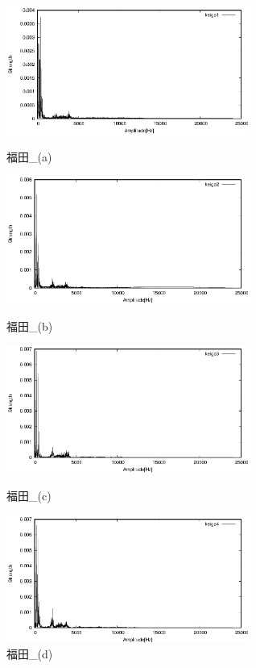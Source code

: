 \documentclass[titlepage]{jarticle}
\begin{document}
\begin{figure}[H]
  \begin{minipage}{0.495\hsize}
    \centering
    \includegraphics[width=8cm]{img/keigo1.eps}
    \caption{福田\_(a)}
    \label{keigo1}
  \end{minipage}
  \begin{minipage}{0.495\hsize}
    \centering
    \includegraphics[width=8cm]{img/keigo2.eps}
    \caption{福田\_(b)}
    \label{keigo2}
  \end{minipage}


  \begin{minipage}{0.495\hsize}
    \centering
    \includegraphics[width=8cm]{img/keigo3.eps}
    \caption{福田\_(c)}
    \label{keigo3}
  \end{minipage}
  \begin{minipage}{0.495\hsize}
    \centering
    \includegraphics[width=8cm]{img/keigo4.eps}
    \caption{福田\_(d)}
    \label{keigo4}
  \end{minipage}
\end{figure}
\end{document}
